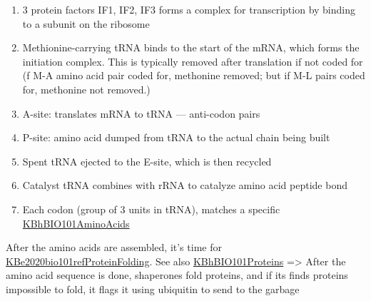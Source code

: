 \documentclass[letterpaper]{article}
\begin{document}
\begin{enumerate}
\item 3 protein factors IF1, IF2, IF3 forms a complex for transcription by
binding to a subunit on the ribosome
\item Methionine-carrying tRNA binds to the start of the mRNA, which forms
the initiation complex. This is typically removed after translation
if not coded for (f M-A amino acid pair coded for, methonine removed;
but if M-L pairs coded for, methonine not removed.)
\item A-site: translates mRNA to tRNA --- anti-codon pairs
\item P-site: amino acid dumped from tRNA to the actual chain being built
\item Spent tRNA ejected to the E-site, which is then recycled
\item Catalyst tRNA combines with rRNA to catalyze amino acid peptide bond
\item Each codon (group of 3 units in tRNA), matches a specific
\href{KBhBIO101AminoAcids.org}{KBhBIO101AminoAcids}
\end{enumerate}

After the amino acids are assembled, it's time for
\href{KBe2020bio101refProteinFolding.org}{KBe2020bio101refProteinFolding}.
See also \href{KBhBIO101Proteins.org}{KBhBIO101Proteins} => After the
amino acid sequence is done, shaperones fold proteins, and if its finds
proteins impossible to fold, it flags it using ubiquitin to send to the
garbage
\end{document}

